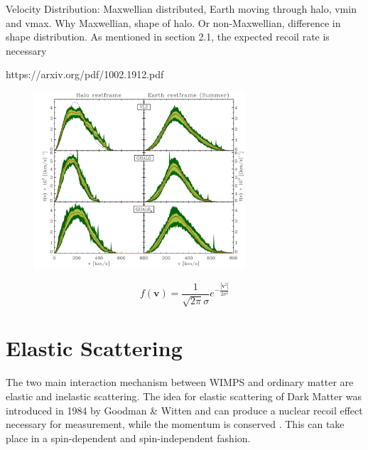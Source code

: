 \documentclass{article}
\begin{document}
Velocity Distribution:
Maxwellian distributed, Earth moving through halo, vmin and vmax. Why Maxwellian, shape of halo. 
Or non-Maxwellian, difference in shape distribution. 
As mentioned in section 2.1, the expected recoil rate is necessary 

https://arxiv.org/pdf/1002.1912.pdf
\begin{figure}[h]
    \centering
    \includegraphics[width=0.7\textwidth]{Vel-dist.png}
    \caption{}
\end{figure}


\begin{equation}
    f(\textbf{v}) = \frac{1}{\sqrt{2\pi}\sigma}e^{-\frac{|\textbf{v}^{2}|}{2\sigma^{2}}}
\end{equation}


% 

\FloatBarrier
\section{Elastic Scattering}

The two main interaction mechanism between WIMPS and ordinary matter are elastic and inelastic scattering. The idea for elastic scattering of Dark Matter was introduced in 1984 by Goodman \& Witten \cite{Goodman:1984dc} and can produce a nuclear recoil effect necessary for measurement, while the momentum is conserved \cite{Undagoitia:2015gya, Lewin:1995rx}. This can take place in a spin-dependent and spin-independent fashion. 
\end{document}
